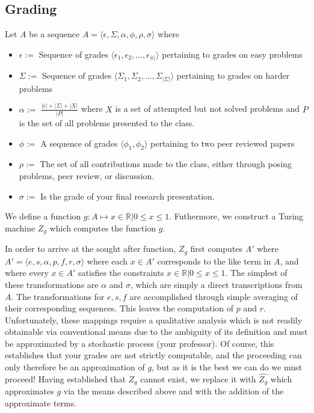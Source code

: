\documentclass[11pt]{article}
\begin{document}
\subsection*{Grading}
Let $A$ be a sequence $A=\langle \epsilon, \Sigma,
\alpha, \phi, \rho, \sigma \rangle$ where 

\begin{itemize}
    \item $\epsilon := $ Sequence of grades $\langle
        \epsilon_1, \epsilon_2, \dots, \epsilon_{|\epsilon|} \rangle$
        pertaining to grades on easy problems
    \item $\Sigma := $ Sequence of grades $\langle \Sigma_1,
        \Sigma_2, \dots, \Sigma_{|\Sigma|}\rangle$ pertaining to
        grades on harder problems
    \item $\alpha := $  $\displaystyle\frac{|\epsilon|
        + |\Sigma| + |X|}{|P|}$ where $X$ is a set of attempted but
        not solved problems and $P$ is the set of all problems
        presented to the class.
    \item $\phi := $ A sequence of grades $\langle \phi_1,
        \phi_2 \rangle$ pertaining to two peer reviewed papers
    \item $\rho := $ The set of all contributions made to the
        class, either through posing problems, peer review, or
        discussion.
    \item $\sigma := $ Is the grade of your final research
        presentation.
\end{itemize}

We define a function $g : A \mapsto x \in \mathbb{R} | 0 \leq
x \leq 1$.  Futhermore, we construct a Turing machine
$Z_g$ which computes the function $g$.

In order to arrive at the sought after function, $Z_g$
first computes $A'$ where $A'=\langle e, s, \alpha, p,
f, r, \sigma \rangle$ where each $x \in A'$
corresponds to the like term in $A$, and where every
$x \in A'$ satisfies the constraints $x \in
\mathbb{R}| 0 \leq x \leq 1$.  The simplest of these
transformations are $\alpha$ and $\sigma$, which
are simply a direct transcriptions from $A$.  The
transformations for $e,s,f$ are accomplished through simple
averaging of their corresponding sequences.  This leaves the
computation of $p$ and $r$.  Unfortunately,
these mappings require a qualitative analysis which is not readily
obtainable via conventional means due to the ambiguity of its
definition and must be approximated by a stochastic process (your
professor).  Of course, this establishes that your grades are not
strictly computable, and the proceeding can only therefore be an
approximation of $g$, but as it is the best we can do we
must proceed!  Having established that $Z_g$ cannot exist,
we replace it with $\hat{Z_g}$ which approximates
$g$ via the means described above and with the addition of
the approximate terms.
\end{document}
